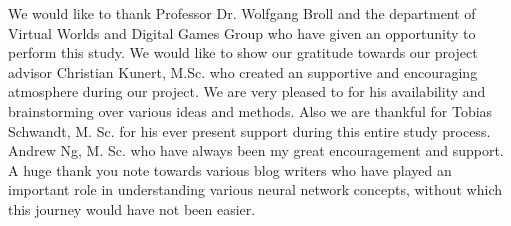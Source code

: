\documentclass[
11pt, %
english, %
singlespacing, %
headsepline, %
]{mediaproject} %
\begin{document}

\begin{acknowledgements}
\addchaptertocentry{\acknowledgementname} %
We would like to thank Professor Dr. Wolfgang Broll and the department of Virtual Worlds and Digital Games Group who have given an opportunity to perform this study. We would like to show our gratitude towards our project advisor Christian Kunert, M.Sc. who created an supportive and encouraging atmosphere during our project. We are very pleased to for his availability and brainstorming over various ideas and methods. Also we are thankful for Tobias Schwandt, M. Sc. for his ever present support during this entire study process. Andrew Ng, M. Sc. who have always been my great encouragement and support. A huge thank you note towards various blog writers who have played an important role in understanding various neural network concepts, without which this journey would have not been easier. 


\end{acknowledgements}


\tableofcontents %

\listoffigures %

\listoftables %



%

\end{document}
